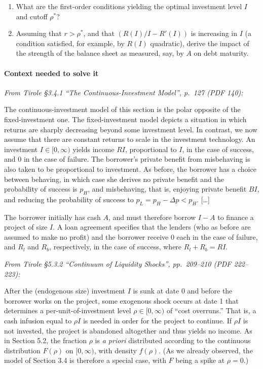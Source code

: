 \documentclass[11pt,a4paper]{article}
\begin{document}
\begin{enumerate}
\def\labelenumi{(\roman{enumi})}
\item
  What are the first-order conditions yielding the optimal investment level \(I\) and cutoff
  \(\rho^*\)?
\item
  Assuming that \(r > \rho^*\), and that \((R(I)/I - R'(I))\) is increasing in \(I\) (a condition
  satisfied, for example, by \(R(I)\) quadratic), derive the impact of the strength of the balance
  sheet as measured, say, by \(A\) on debt maturity.
\end{enumerate}

\paragraph{Context needed to solve it}

\emph{From Tirole §3.4.1 ``The Continuous-Investment Model'', p.~127 (PDF 140):}

The continuous-investment model of this section is the polar opposite of the fixed-investment one.
The fixed-investment model depicts a situation in which returns are sharply decreasing beyond some
investment level. In contrast, we now assume that there are constant returns to scale in the
investment technology. An investment \(I \in [0, \infty)\) yields income \(RI\), proportional to
\(I\), in the case of success, and 0 in the case of failure. The borrower's private benefit from
misbehaving is also taken to be proportional to investment. As before, the borrower has a choice
between behaving, in which case she derives no private benefit and the probability of success is
\(p_H\), and misbehaving, that is, enjoying private benefit \(BI\), and reducing the probability of
success to \(p_L = p_H - \Delta p < p_H\). {[}\ldots{]}

The borrower initially has cash \(A\), and must therefore borrow \(I - A\) to finance a project of
size \(I\). A loan agreement specifies that the lenders (who as before are assumed to make no
profit) and the borrower receive 0 each in the case of failure, and \(R_l\) and \(R_b\),
respectively, in the case of success, where \(R_l + R_b = RI\).

\emph{From Tirole §5.3.2 ``Continuum of Liquidity Shocks'', pp.~209--210 (PDF 222--223):}

After the (endogenous size) investment \(I\) is sunk at date 0 and before the borrower works on the
project, some exogenous shock occurs at date 1 that determines a per-unit-of-investment level
\(\rho \in [0, \infty)\) of ``cost overruns.'' That is, a cash infusion equal to \(\rho I\) is
needed in order for the project to continue. If \(\rho I\) is not invested, the project is abandoned
altogether and thus yields no income. As in Section 5.2, the fraction \(\rho\) is \emph{a priori}
distributed according to the continuous distribution \(F(\rho)\) on \([0, \infty)\), with density
\(f(\rho)\). (As we already observed, the model of Section 3.4 is therefore a special case, with
\(F\) being a spike at \(\rho = 0\).)
\end{document}
